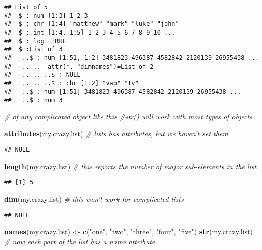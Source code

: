 \documentclass[]{article}
\newenvironment{Shaded}{\begin{snugshade}}{\end{snugshade}}
\newcommand{\KeywordTok}[1]{\textcolor[rgb]{0.13,0.29,0.53}{\textbf{#1}}}
\newcommand{\StringTok}[1]{\textcolor[rgb]{0.31,0.60,0.02}{#1}}
\newcommand{\CommentTok}[1]{\textcolor[rgb]{0.56,0.35,0.01}{\textit{#1}}}
\newcommand{\NormalTok}[1]{#1}
\begin{document}
\begin{verbatim}
## List of 5
##  $ : num [1:3] 1 2 3
##  $ : chr [1:4] "matthew" "mark" "luke" "john"
##  $ : int [1:4, 1:5] 1 2 3 4 5 6 7 8 9 10 ...
##  $ : logi TRUE
##  $ :List of 3
##   ..$ : num [1:51, 1:2] 3481823 496387 4582842 2120139 26955438 ...
##   .. ..- attr(*, "dimnames")=List of 2
##   .. .. ..$ : NULL
##   .. .. ..$ : chr [1:2] "vap" "tv"
##   ..$ : num [1:51] 3481823 496387 4582842 2120139 26955438 ...
##   ..$ : num 3
\end{verbatim}

\begin{Shaded}
\begin{Highlighting}[]
\CommentTok{# of any complicated object like this}
\CommentTok{#str() will work with most types of objects}

\KeywordTok{attributes}\NormalTok{(my.crazy.list) }\CommentTok{# lists has attributes, but we haven't set them}
\end{Highlighting}
\end{Shaded}

\begin{verbatim}
## NULL
\end{verbatim}

\begin{Shaded}
\begin{Highlighting}[]
\KeywordTok{length}\NormalTok{(my.crazy.list) }\CommentTok{# this reports the number of major sub-elements in the list}
\end{Highlighting}
\end{Shaded}

\begin{verbatim}
## [1] 5
\end{verbatim}

\begin{Shaded}
\begin{Highlighting}[]
\KeywordTok{dim}\NormalTok{(my.crazy.list) }\CommentTok{# this won't work for complicated lists}
\end{Highlighting}
\end{Shaded}

\begin{verbatim}
## NULL
\end{verbatim}

\begin{Shaded}
\begin{Highlighting}[]
\KeywordTok{names}\NormalTok{(my.crazy.list) <-}\StringTok{ }\KeywordTok{c}\NormalTok{(}\StringTok{"one"}\NormalTok{, }\StringTok{"two"}\NormalTok{, }\StringTok{"three"}\NormalTok{, }\StringTok{"four"}\NormalTok{, }\StringTok{"five"}\NormalTok{)}
\KeywordTok{str}\NormalTok{(my.crazy.list) }\CommentTok{# now each part of the list has a name attribute}
\end{Highlighting}
\end{Shaded}
\end{document}
